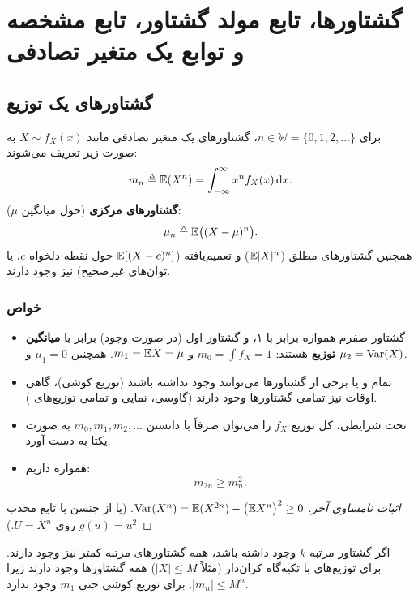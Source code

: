 \chapter{گشتاورها، تابع مولد گشتاور، تابع مشخصه و توابع یک متغیر تصادفی}

\section{گشتاورهای یک توزیع }

\begin{definition}
برای $n\in\mathbb W=\{0,1,2,\ldots\}$، گشتاورهای یک متغیر تصادفی مانند $X\sim f_X(x)$ به صورت زیر تعریف می‌شوند:
\[
m_n\triangleq\mathbb{E}(X^n)=\int_{-\infty}^{\infty}x^nf_X(x)\,\mathrm{d} x .
\]
\textbf{گشتاورهای مرکزی} (حول میانگین $\mu$):
\[
\mu_n\triangleq\mathbb{E}\big((X-\mu)^n\big).
\]
همچنین گشتاورهای \textcolor{red!70!black}{مطلق} ($\mathbb{E}|X|^n$) و \textcolor{red!70!black}{تعمیم‌یافته} ($\mathbb{E}[(X-c)^n]$ حول نقطه دلخواه $c$، یا توان‌های غیرصحیح) نیز وجود دارند.
\end{definition}

\subsection{خواص}
\begin{itemize}
\item گشتاور صفرم همواره برابر با ۱، و گشتاور اول (در صورت وجود) برابر با \textbf{میانگین توزیع} هستند: $m_0=\int f_X=1$ و $m_1=\mathbb{E} X=\mu$. همچنین $\mu_1=0$ و $\mu_2=\operatorname{Var}(X)$.
\item تمام و یا برخی از گشتاورها می‌توانند وجود نداشته باشند (\textcolor{red!70!black}{توزیع کوشی})، گاهی اوقات نیز تمامی گشتاورها وجود دارند (\textcolor{blue!60!black}{گاوسی، نمایی و تمامی توزیع‌های }).
\item تحت شرایطی، کل توزیع $f_X$ را می‌توان صرفاً با دانستن $m_0,m_1,m_2,\ldots$ به صورت یکتا به دست آورد.
\item همواره داریم:
\[
m_{2n}\ge m_n^2 .
\]
\end{itemize}
\begin{proof}[اثبات نامساوی آخر]
$\operatorname{Var}(X^n)=\mathbb{E}(X^{2n})-\big(\mathbb{E} X^n\big)^2\ge0$. (یا از جنسن با تابع محدب $g(u)=u^2$ روی $U=X^n$.)
\end{proof}

\begin{note}
\notetitle اگر گشتاور مرتبه $k$ وجود داشته باشد، همه گشتاورهای مرتبه کمتر نیز وجود دارند. برای توزیع‌های با تکیه‌گاه کران‌دار (مثلاً $|X|\le M$) همه گشتاورها وجود دارند زیرا $|m_n|\le M^n$. برای توزیع کوشی حتی $m_1$ وجود ندارد.
\end{note}

